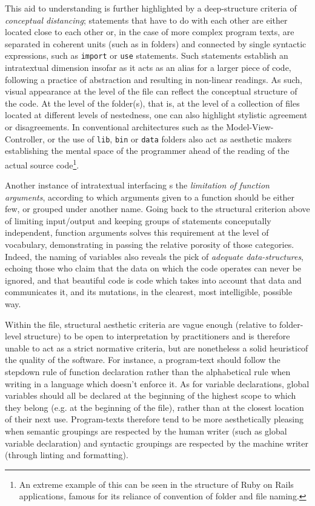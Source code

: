 This aid to understanding is further highlighted by a deep-structure criteria of \emph{conceptual distancing}; statements that have to do with each other are either located close to each other or, in the case of more complex program texts, are separated in coherent units (such as in folders) and connected by single syntactic expressions, such as \lstinline{import} or \lstinline{use} statements. Such statements establish an intratextual dimension insofar as it acts as an alias for a larger piece of code, following a practice of abstraction and resulting in non-linear readings. As such, visual appearance at the level of the file can reflect the conceptual structure of the code. At the level of the folder(s), that is, at the level of a collection of files located at different levels of nestedness, one can also highlight stylistic agreement or disagreements. In conventional architectures such as the Model-View-Controller, or the use of \lstinline{lib}, \lstinline{bin} or \lstinline{data} folders also act as aesthetic makers establishing the mental space of the programmer ahead of the reading of the actual source code\footnote{An extreme example of this can be seen in the structure of Ruby on Rails applications, famous for its reliance of convention of folder and file naming.}.

Another instance of intratextual interfacing s the \emph{limitation of function arguments}, according to which arguments given to a function should be either few, or grouped under another name. Going back to the structural criterion above of limiting input/output and keeping groups of statements conceputally independent, function arguments solves this requirement at the level of vocabulary, demonstrating in passing the relative porosity of those categories. Indeed, the naming of variables also reveals the pick of \emph{adequate data-structures}, echoing those who claim that the data on which the code operates can never be ignored, and that beautiful code is code which takes into account that data and communicates it, and its mutations, in the clearest, most intelligible, possible way.

Within the file, structural aesthetic criteria are vague enough (relative to folder-level structure) to be open to interpretation by practitioners and is therefore unable to act as a strict normative criteria, but are nonetheless a solid heuristicof the quality of the software. For instance, a program-text should follow the stepdown rule of function declaration rather than the alphabetical rule when writing in a language which doesn't enforce it. As for variable declarations, global variables should all be declared at the beginning of the highest scope to which they belong (e.g. at the beginning of the file), rather than at the closest location of their next use. Program-texts therefore tend to be more aesthetically pleasing when semantic groupings are respected by the human writer (such as global variable declaration) and syntactic groupings are respected by the machine writer (through linting and formatting).

